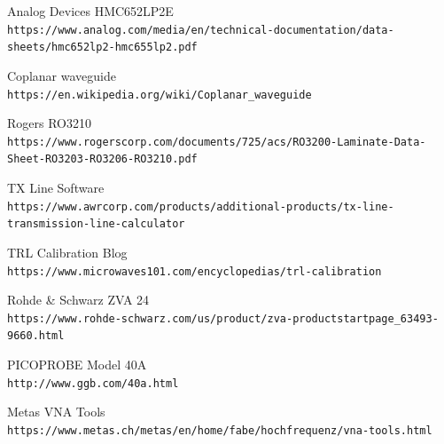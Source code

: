 \documentclass[10pt, a4paper, twocolumn]{article}
\begin{document}
\begin{thebibliography}{9}

Analog Devices HMC652LP2E
\\\texttt{https://www.analog.com/media/en/technical-documentation/data-sheets/hmc652lp2-hmc655lp2.pdf}

Coplanar waveguide
\\\texttt{https://en.wikipedia.org/wiki/Coplanar\_waveguide}

Rogers RO3210
\\\texttt{https://www.rogerscorp.com/documents/725/acs/RO3200-Laminate-Data-Sheet-RO3203-RO3206-RO3210.pdf}

TX Line Software
\\\texttt{https://www.awrcorp.com/products/additional-products/tx-line-transmission-line-calculator}

TRL Calibration Blog
\\\texttt{https://www.microwaves101.com/encyclopedias/trl-calibration}

Rohde \& Schwarz ZVA 24
\\\texttt{https://www.rohde-schwarz.com/us/product/zva-productstartpage\_63493-9660.html}

PICOPROBE Model 40A
\\\texttt{http://www.ggb.com/40a.html}

Metas VNA Tools
\\\texttt{https://www.metas.ch/metas/en/home/fabe/hochfrequenz/vna-tools.html}

\end{thebibliography}
\end{document}
